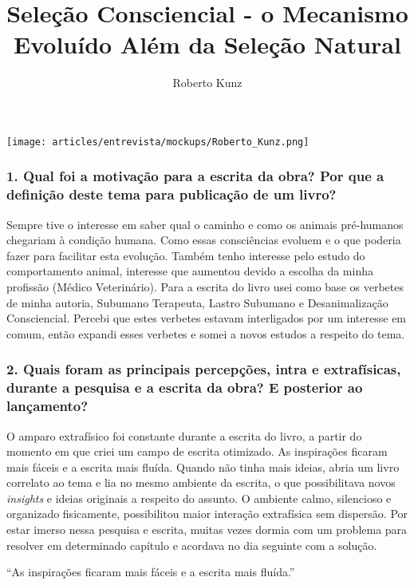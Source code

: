 \documentclass{gescons}
\author{Roberto Kunz}
\title{Seleção Consciencial - o Mecanismo Evoluído Além da Seleção Natural}
\begin{document}
    \makeentrevistatitle

    \begin{multicols}{2}

\begin{center}
    \texttt{[image: articles/entrevista/mockups/Roberto\_Kunz.png]}
\end{center}


\subsubsection{1. Qual foi a motivação para a escrita da obra? Por que a definição deste tema para publicação de um livro?}

Sempre tive o interesse em saber qual o caminho e como os animais pré-humanos chegariam à condição humana. Como essas consciências evoluem e o que poderia fazer para facilitar esta evolução. Também tenho interesse pelo estudo do comportamento animal, interesse que aumentou devido a escolha da minha profissão (Médico Veterinário). Para a escrita do livro usei como base os verbetes de minha autoria, Subumano Terapeuta, Lastro Subumano e Desanimalização Consciencial. Percebi que estes verbetes estavam interligados por um interesse em comum, então expandi esses verbetes e somei a novos estudos a respeito do tema.

\subsubsection{2. Quais foram as principais percepções, intra e extrafísicas, durante a pesquisa e a escrita da obra? E posterior ao lançamento?}

O amparo extrafísico foi constante durante a escrita do livro, a partir do momento em que criei um campo de escrita otimizado. As inspirações ficaram mais fáceis e a escrita mais fluída. Quando não tinha mais ideias, abria um livro correlato ao tema e lia no mesmo ambiente da escrita, o que possibilitava novos \emph{insights} e ideias originais a respeito do assunto. O ambiente calmo, silencioso e organizado fisicamente, possibilitou maior interação extrafísica sem dispersão. Por estar imerso nessa pesquisa e escrita, muitas vezes dormia com um problema para resolver em determinado capítulo e acordava no dia seguinte com a solução.

\begin{pullquote}
    ``As inspirações ficaram mais fáceis e a escrita mais fluída.''
\end{pullquote}


\end{multicols}
\end{document}

